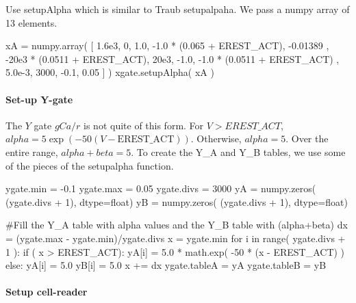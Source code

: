 \documentclass[]{article}%
\begin{document}
  Use {\Tt{}setupAlpha\nwendquote} which is similar to Traub {\Tt{}setupalpaha\nwendquote}. We pass a numpy
  array of 13 elements.

\nwenddocs{}\endmoddef\nwstartdeflinemarkup{}\nwenddeflinemarkup
xA = numpy.array( [ 1.6e3, 0, 1.0, -1.0 * (0.065 + EREST_ACT), -0.01389
        , -20e3 * (0.0511 + EREST_ACT), 20e3, -1.0, -1.0 * (0.0511 + EREST_ACT)
        , 5.0e-3, 3000, -0.1, 0.05 ] )
xgate.setupAlpha( xA )
\eatline
{}\nwendcode{}\nwdocspar
\paragraph{Set-up Y-gate}

  The $Y$ gate $gCa/r$ is not quite of this form.  For $V > EREST\_ACT$, $alpha =
  5 \exp(-50(V - \text{EREST\_ACT}))$.  Otherwise, $alpha = 5$.  Over the entire
  range, $alpha + beta = 5$.  To create the {\Tt{}Y{\_}A\nwendquote} and {\Tt{}Y{\_}B\nwendquote} tables, we use some
  of the pieces of the {\Tt{}setupalpha\nwendquote} function.

\nwenddocs{}\endmoddef\nwstartdeflinemarkup{}\nwenddeflinemarkup
ygate.min = -0.1
ygate.max = 0.05
ygate.divs = 3000
yA = numpy.zeros( (ygate.divs + 1), dtype=float)
yB = numpy.zeros( (ygate.divs + 1), dtype=float)

#Fill the Y_A table with alpha values and the Y_B table with (alpha+beta)
dx = (ygate.max - ygate.min)/ygate.divs
x = ygate.min
for i in range( ygate.divs + 1 ):
  if ( x > EREST_ACT):
    yA[i] = 5.0 * math.exp( -50 * (x - EREST_ACT) )
  else:
    yA[i] = 5.0
  yB[i] = 5.0
  x += dx
ygate.tableA = yA
ygate.tableB = yB
\nwendcode{}\nwdocspar

\paragraph{Setup cell-reader}
\end{document}

